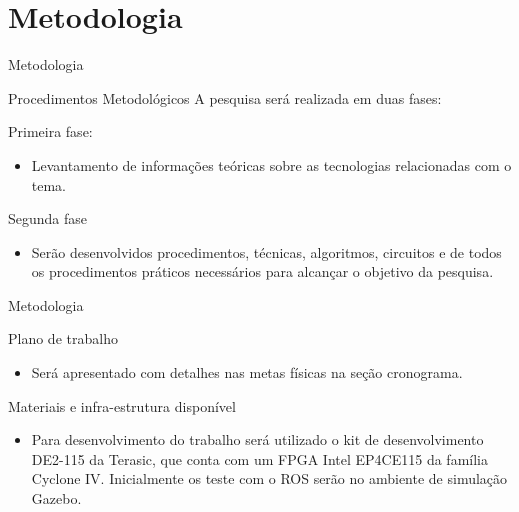 \documentclass[10pt]{beamer}
\begin{document}
\section{Metodologia}

\begin{frame}{Metodologia}
    \begin{alertblock}{Procedimentos Metodológicos}
        A pesquisa será realizada em duas fases:
        \begin{block}{Primeira fase:}
            \begin{itemize}
                \item Levantamento de informações teóricas sobre as tecnologias relacionadas com o tema.
            \end{itemize}
        \end{block}
    
        \begin{block}{Segunda fase}
            \begin{itemize}
                \item Serão desenvolvidos procedimentos, técnicas, algoritmos, circuitos e de todos os procedimentos práticos necessários para alcançar o objetivo da pesquisa.
            \end{itemize}
        \end{block}
    \end{alertblock}

  
\end{frame}

{
\begin{frame}{Metodologia}
	\begin{alertblock}{Plano de trabalho}
	    \begin{itemize}
	        \item Será apresentado com detalhes nas metas físicas na seção cronograma.
	    \end{itemize}
	\end{alertblock}
	
	\begin{alertblock}{Materiais e infra-estrutura disponível}
	    \begin{itemize}
	        \item Para desenvolvimento do trabalho será utilizado o kit de desenvolvimento DE2-115
        da Terasic, que conta com um FPGA Intel EP4CE115 da família Cyclone IV. Inicialmente
        os teste com o ROS serão no ambiente de simulação Gazebo.
        \end{itemize}
	\end{alertblock}
	
\end{frame}
}
\end{document}
